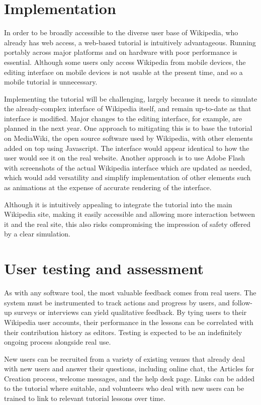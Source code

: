 \documentclass{acm_proc_article-sp}
\begin{document}
\section{Implementation}

In order to be broadly accessible to the diverse user base of Wikipedia, who already has web access, a web-based tutorial is intuitively advantageous. Running portably across major platforms and on hardware with poor performance is essential. Although some users only access Wikipedia from mobile devices, the editing interface on mobile devices is not usable at the present time, and so a mobile tutorial is unnecessary.

Implementing the tutorial will be challenging, largely because it needs to simulate the already-complex interface of Wikipedia itself, and remain up-to-date as that interface is modified. Major changes to the editing interface, for example,  are planned in the next year. One approach to mitigating this is to base the tutorial on MediaWiki, the open source software used by Wikipedia, with other elements added on top using Javascript. The interface would appear identical to how the user would see it on the real website. Another approach is to use Adobe Flash with screenshots of the actual Wikipedia interface which are updated as needed, which would add versatility and simplify implementation of other elements such as animations at the expense of accurate rendering of the interface.

Although it is intuitively appealing to integrate the tutorial into the main Wikipedia site, making it easily accessible and allowing more interaction between it and the real site, this also risks compromising the impression of safety offered by a clear simulation.

\section{User testing and assessment}

As with any software tool, the most valuable feedback comes from real users. The system must be instrumented to track actions and progress by users, and follow-up surveys or interviews can yield qualitative feedback. By tying users to their Wikipedia user accounts, their performance in the lessons can be correlated with their contribution history as editors. Testing is expected to be an indefinitely ongoing process alongside real use.

New users can be recruited from a variety of existing venues that already deal with new users and answer their questions, including online chat, the Articles for Creation process, welcome messages, and the help desk page. Links can be added to the tutorial where suitable, and volunteers who deal with new users can be trained to link to relevant tutorial lessons over time.
\end{document}
